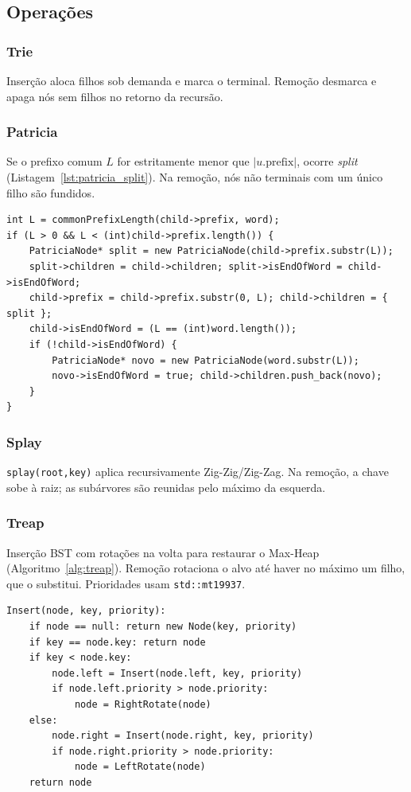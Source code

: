 \documentclass[11pt, a4paper]{article}
\begin{document}
\subsection{Operações}

\subsubsection{Trie}
Inserção aloca filhos sob demanda e marca o terminal. Remoção desmarca e apaga nós sem filhos no retorno da recursão.

\subsubsection{Patricia}
Se o prefixo comum $L$ for estritamente menor que $|u.\mathrm{prefix}|$, ocorre \textit{split} (Listagem~\ref{lst:patricia_split}). Na remoção, nós não terminais com um único filho são fundidos.

\begin{lstlisting}[caption={Split na Patricia},label={lst:patricia_split}]
int L = commonPrefixLength(child->prefix, word);
if (L > 0 && L < (int)child->prefix.length()) {
    PatriciaNode* split = new PatriciaNode(child->prefix.substr(L));
    split->children = child->children; split->isEndOfWord = child->isEndOfWord;
    child->prefix = child->prefix.substr(0, L); child->children = { split };
    child->isEndOfWord = (L == (int)word.length());
    if (!child->isEndOfWord) {
        PatriciaNode* novo = new PatriciaNode(word.substr(L));
        novo->isEndOfWord = true; child->children.push_back(novo);
    }
}
\end{lstlisting}

\subsubsection{Splay}
\texttt{splay(root,key)} aplica recursivamente Zig-Zig/Zig-Zag. Na remoção, a chave sobe à raiz; as subárvores são reunidas pelo máximo da esquerda.

\subsubsection{Treap}
Inserção BST com rotações na volta para restaurar o Max-Heap (Algoritmo~\ref{alg:treap}). Remoção rotaciona o alvo até haver no máximo um filho, que o substitui. Prioridades usam \texttt{std::mt19937}.

\begin{lstlisting}[caption={Inserção na Treap (Max-Heap)},label={alg:treap}]
Insert(node, key, priority):
    if node == null: return new Node(key, priority)
    if key == node.key: return node
    if key < node.key:
        node.left = Insert(node.left, key, priority)
        if node.left.priority > node.priority:
            node = RightRotate(node)
    else:
        node.right = Insert(node.right, key, priority)
        if node.right.priority > node.priority:
            node = LeftRotate(node)
    return node
\end{lstlisting}
\end{document}
